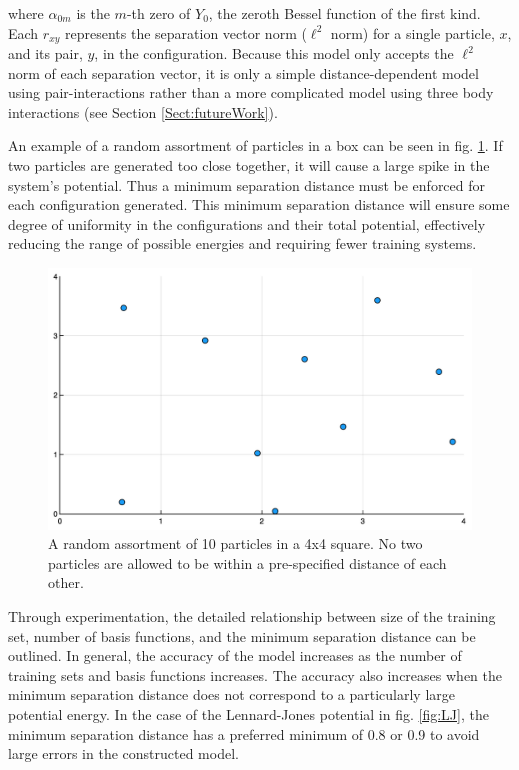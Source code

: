 where $\alpha_{0m}$ is the $m$-th zero of $Y_0$, the zeroth Bessel function of the first kind. Each $r_{xy}$ represents the separation vector norm ($\ell^2$ norm) for a single particle, $x$, and its pair, $y$, in the configuration. Because this model only accepts the $\ell^2$ norm of each separation vector, it is only a simple distance-dependent model using pair-interactions rather than a more complicated model using three body interactions (see Section \ref{Sect:futureWork}).

\par An example of a random assortment of particles in a box can be seen in fig. \ref{fig:tenParticles}. If two particles are generated too close together, it will cause a large spike in the system's potential. Thus a minimum separation distance must be enforced for each configuration generated. This minimum separation distance will ensure some degree of uniformity in the configurations and their total potential, effectively reducing the range of possible energies and requiring fewer training systems. 

\begin{figure}%
\centering
\includegraphics[scale = 0.4]{Figures/tenParticles}
\caption{A random assortment of 10 particles in a 4x4 square. No two particles are allowed to be within a pre-specified distance of each other. 
\label{fig:tenParticles}} 
\end{figure}

\par Through experimentation, the detailed relationship between size of the training set, number of basis functions, and the minimum separation distance can be outlined. In general, the accuracy of the model increases as the number of training sets and basis functions increases. The accuracy also increases when the minimum separation distance does not correspond to a particularly large potential energy. In the case of the Lennard-Jones potential in fig. \ref{fig:LJ}, the minimum separation distance has a preferred minimum of 0.8 or 0.9 to avoid large errors in the constructed model.



